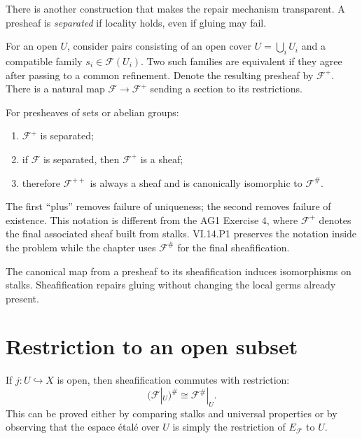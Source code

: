 There is another construction that makes the repair mechanism transparent.  A presheaf is
\emph{separated} if locality holds, even if gluing may fail.

For an open $U$, consider pairs consisting of an open cover $U=\bigcup_iU_i$ and a compatible
family $s_i\in\mathcal F(U_i)$.  Two such families are equivalent if they agree after passing
to a common refinement.  Denote the resulting presheaf by $\mathcal F^+$.  There is a
natural map $\mathcal F\to\mathcal F^+$ sending a section to its restrictions.

\begin{theorem}
For presheaves of sets or abelian groups:
\begin{enumerate}
\item $\mathcal F^+$ is separated;
\item if $\mathcal F$ is separated, then $\mathcal F^+$ is a sheaf;
\item therefore $\mathcal F^{++}$ is always a sheaf and is canonically isomorphic to
$\mathcal F^\#$.
\end{enumerate}
\end{theorem}



The first ``plus'' removes failure of uniqueness; the second removes failure of existence.
This notation is different from the AG1 Exercise 4, where $\mathcal F^+$ denotes the
final associated sheaf built from stalks.  VI.14.P1 preserves the notation inside the
problem while the chapter uses $\mathcal F^\#$ for the final sheafification.

\begin{example}\label{ex:vi14-expand-03}
The canonical map from a presheaf to its sheafification induces isomorphisms on stalks.  Sheafification repairs gluing without changing the local germs already present.
\end{example}
\section{Restriction to an open subset}

If $j:U\hookrightarrow X$ is open, then sheafification commutes with restriction:
\[
(\mathcal F|_U)^\#\cong\mathcal F^\#|_U.
\]
This can be proved either by comparing stalks and universal properties or by observing that
the espace \'{e}tal\'{e} over $U$ is simply the restriction of $E_{\mathcal F}$ to $U$.

